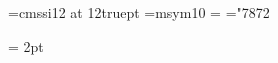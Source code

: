 

\font\bit=cmssi12 at 12truept
\font\tenmsy=msym10
=\tenmsy
\mathchardef\ssm="7872



\mathsurround = 2pt
\abovedisplayskip=6pt
\belowdisplayskip=6pt
\def \PM {{\cal P \! M }}
\def \QP{\narrower\medskip\noindent}
\def \QED {\rlap{$\sqcup$}$\sqcap$\smallskip}
\def\Z{{\bf Z}}
\def\R{{\bf R}}
\def\C{{\bf C}}
\def\ref{\hangindent=1pc \hangafter=1 \noindent}
\def\mod{{\rm mod\;}}
\def\sgn{{\rm sgn}}
